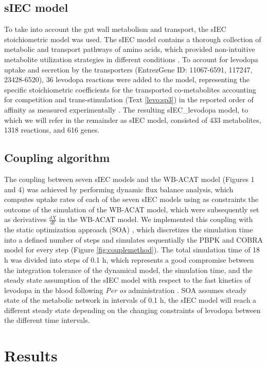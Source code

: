 \subsection{sIEC model}
To take into account the gut wall metabolism and transport, the sIEC stoichiometric model was used. The sIEC model contains a thorough collection of metabolic and transport pathways of amino acids, which provided non-intuitive metabolite utilization strategies in different conditions \cite{sahoo2013predicting}. To account for levodopa uptake and secretion by the transporters (EntrezGene ID: 11067-6591, 117247, 23428-6520), 36 levodopa reactions were added to the model, representing the specific stoichiometric coefficients for the transported co-metabolites accounting for competition and trans-stimulation (Text \ref{levo:sp3}) in the reported order of affinity \cite{verrey2000glycoprotein} as measured experimentally \cite{camargo2014molecular}. The resulting sIEC\_levodopa model, to which we will refer in the remainder as sIEC model, consisted of 433 metabolites, 1318 reactions, and 616 genes.
\subsection{Coupling algorithm}
The coupling between seven sIEC models and the WB-ACAT model (Figures 1 and 4) was achieved by performing dynamic flux balance analysis\cite{varma1994stoichiometric}, which computes uptake rates of each of the seven sIEC models using as constraints the outcome of the simulation of the WB-ACAT model, which were subsequently set as derivatives $\frac{dX}{dt}$ in the WB-ACAT model. We implemented this coupling with the static optimization approach (SOA) \cite{mahadevan2002dynamic}, which discretizes the simulation time into a defined number of steps and simulates sequentially the PBPK and COBRA model for every step \cite{mahadevan2002dynamic} (Figure \ref{fig:couplemethod}). The total simulation time of 18 h was divided into steps of 0.1 h, which represents a good compromise between the integration tolerance of the dynamical model, the simulation time, and the steady state assumption of the sIEC model with respect to the fast kinetics of levodopa in the blood following \textit{Per os} administration \cite{covert2008integrating}. SOA assumes steady state of the metabolic network in intervals of 0.1 h, the sIEC model will reach a different steady state depending on the changing constraints of levodopa between the different time intervals.
\section{Results}
